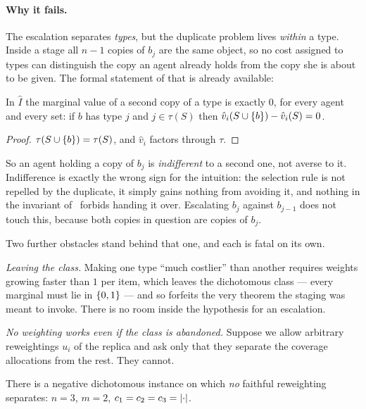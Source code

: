 \paragraph{Why it fails.} The escalation separates \emph{types}, but the
duplicate problem lives \emph{within} a type. Inside a stage all $n-1$ copies of
$b_j$ are the same object, so no cost assigned to types can distinguish the copy
an agent already holds from the copy she is about to be given. The formal
statement of that is already available:

\begin{theorem}
\label{thm:w1}
In $\hat{I}$ the marginal value of a second copy of a type is exactly $0$, for
every agent and every set: if $b$ has type $j$ and $j \in \tau(S)$ then
$\hat{v}_i(S \cup \left\{b\right\}) - \hat{v}_i(S) = 0$.
\end{theorem}

\begin{proof}
$\tau(S \cup \left\{b\right\}) = \tau(S)$, and $\hat{v}_i$ factors through $\tau$.
\end{proof}

So an agent holding a copy of $b_j$ is \emph{indifferent} to a second one, not
averse to it. Indifference is exactly the wrong sign for the intuition: the
selection rule is not repelled by the duplicate, it simply gains nothing from
avoiding it, and nothing in the invariant of~\cite{BKNS22} forbids handing it
over. Escalating $b_{j}$ against $b_{j-1}$ does not touch this, because both
copies in question are copies of $b_j$.

Two further obstacles stand behind that one, and each is fatal on its own.

\emph{Leaving the class.} Making one type ``much costlier'' than another
requires weights growing faster than $1$ per item, which leaves the dichotomous
class --- every marginal must lie in $\left\{0,1\right\}$ --- and so forfeits the very
theorem the staging was meant to invoke. There is no room inside the hypothesis
for an escalation.

\emph{No weighting works even if the class is abandoned.} Suppose we allow
arbitrary reweightings $u_i$ of the replica and ask only that they separate the
coverage allocations from the rest. They cannot.

\begin{theorem}[No-go]
\label{thm:w4}
There is a negative dichotomous instance on which \emph{no} faithful reweighting
separates: $n = 3$, $m = 2$, $c_1 = c_2 = c_3 = \left\lvert\cdot\right\rvert$.
\end{theorem}

